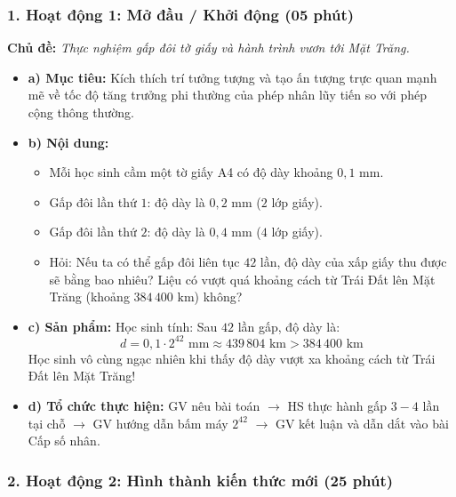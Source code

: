 \documentclass[12pt, a4paper]{article}
\begin{document}
\subsubsection*{1. Hoạt động 1: Mở đầu / Khởi động (05 phút)}
\textbf{Chủ đề:} \textit{Thực nghiệm gấp đôi tờ giấy và hành trình vươn tới Mặt Trăng.}
\begin{itemize}
    \item \textbf{a) Mục tiêu:} Kích thích trí tưởng tượng và tạo ấn tượng trực quan mạnh mẽ về tốc độ tăng trưởng phi thường của phép nhân lũy tiến so với phép cộng thông thường.
    \item \textbf{b) Nội dung:}
    \begin{itemize}
        \item Mỗi học sinh cầm một tờ giấy A4 có độ dày khoảng $0{,}1\text{ mm}$.
        \item Gấp đôi lần thứ $1$: độ dày là $0{,}2\text{ mm}$ ($2$ lớp giấy).
        \item Gấp đôi lần thứ $2$: độ dày là $0{,}4\text{ mm}$ ($4$ lớp giấy).
        \item Hỏi: Nếu ta có thể gấp đôi liên tục $42$ lần, độ dày của xấp giấy thu được sẽ bằng bao nhiêu? Liệu có vượt quá khoảng cách từ Trái Đất lên Mặt Trăng (khoảng $384\,400\text{ km}$) không?
    \end{itemize}
    \item \textbf{c) Sản phẩm:} Học sinh tính: Sau $42$ lần gấp, độ dày là:
    $$d = 0{,}1 \cdot 2^{42}\text{ mm} \approx 439\,804\text{ km} > 384\,400\text{ km}$$
    Học sinh vô cùng ngạc nhiên khi thấy độ dày vượt xa khoảng cách từ Trái Đất lên Mặt Trăng!
    \item \textbf{d) Tổ chức thực hiện:} GV nêu bài toán $\to$ HS thực hành gấp $3 - 4$ lần tại chỗ $\to$ GV hướng dẫn bấm máy $2^{42}$ $\to$ GV kết luận và dẫn dắt vào bài Cấp số nhân.
\end{itemize}


\subsubsection*{2. Hoạt động 2: Hình thành kiến thức mới (25 phút)}
\end{document}
